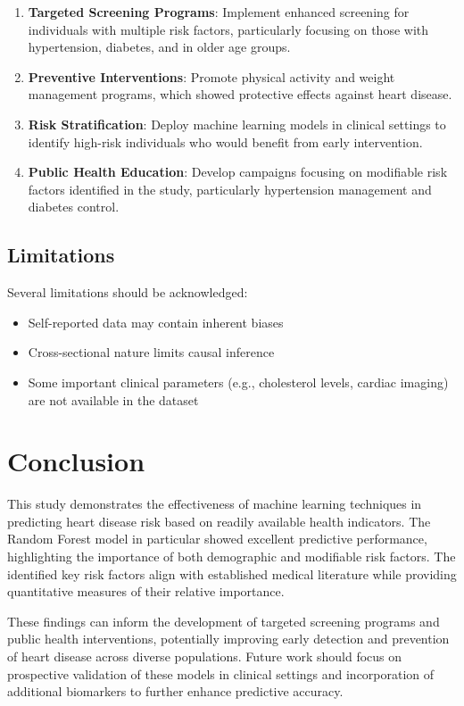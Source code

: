 \documentclass[conference]{IEEEtran}
\begin{document}
\begin{enumerate}
    \item \textbf{Targeted Screening Programs}: Implement enhanced screening for individuals with multiple risk factors, particularly focusing on those with hypertension, diabetes, and in older age groups.
    
    \item \textbf{Preventive Interventions}: Promote physical activity and weight management programs, which showed protective effects against heart disease.
    
    \item \textbf{Risk Stratification}: Deploy machine learning models in clinical settings to identify high-risk individuals who would benefit from early intervention.
    
    \item \textbf{Public Health Education}: Develop campaigns focusing on modifiable risk factors identified in the study, particularly hypertension management and diabetes control.
\end{enumerate}

\subsection{Limitations}
Several limitations should be acknowledged:
\begin{itemize}
    \item Self-reported data may contain inherent biases
    \item Cross-sectional nature limits causal inference
    \item Some important clinical parameters (e.g., cholesterol levels, cardiac imaging) are not available in the dataset
\end{itemize}

\section{Conclusion}
This study demonstrates the effectiveness of machine learning techniques in predicting heart disease risk based on readily available health indicators. The Random Forest model in particular showed excellent predictive performance, highlighting the importance of both demographic and modifiable risk factors. The identified key risk factors align with established medical literature while providing quantitative measures of their relative importance.

These findings can inform the development of targeted screening programs and public health interventions, potentially improving early detection and prevention of heart disease across diverse populations. Future work should focus on prospective validation of these models in clinical settings and incorporation of additional biomarkers to further enhance predictive accuracy.
\end{document}
